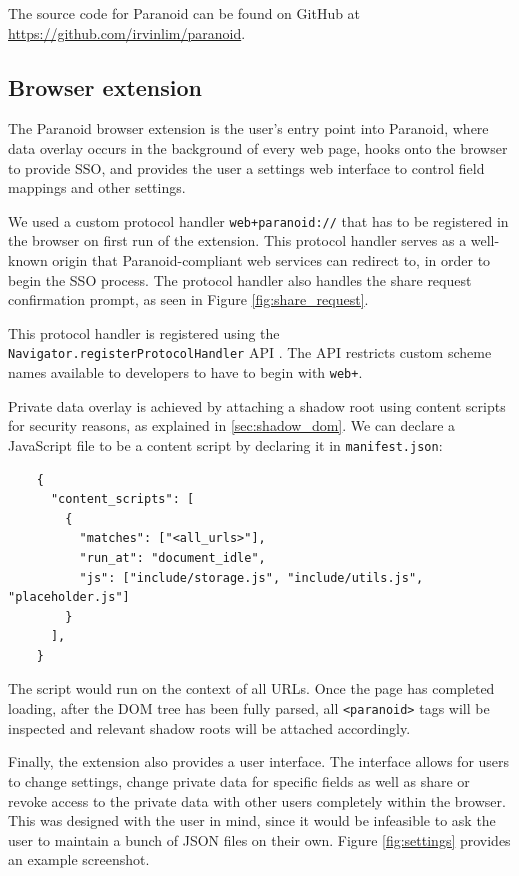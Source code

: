 \documentclass[letterpaper,twocolumn,10pt]{article}
\begin{document}
The source code for Paranoid can be found on GitHub at \url{https://github.com/irvinlim/paranoid}.

\subsection{Browser extension}

The Paranoid browser extension is the user's entry point into Paranoid, where data overlay occurs in the background of every web page, hooks onto the browser to provide SSO, and provides the user a settings web interface to control field mappings and other settings.

We used a custom protocol handler \texttt{web+paranoid://} that has to be registered in the browser on first run of the extension. This protocol handler serves as a well-known origin that Paranoid-compliant web services can redirect to, in order to begin the SSO process. The protocol handler also handles the share request confirmation prompt, as seen in Figure \ref{fig:share_request}.

This protocol handler is registered using the \texttt{Navigator.registerProtocolHandler} API \cite{RegisterProtocolHandler}. The API restricts custom scheme names available to developers to have to begin with \texttt{web+}.

Private data overlay is achieved by attaching a shadow root using content scripts for security reasons, as explained in \cref{sec:shadow_dom}. We can declare a JavaScript file to be a content script by declaring it in \texttt{manifest.json}:

\begin{center}
    \begin{lstlisting}
    {
      "content_scripts": [
        {
          "matches": ["<all_urls>"],
          "run_at": "document_idle",
          "js": ["include/storage.js", "include/utils.js", "placeholder.js"]
        }
      ],
    }
    \end{lstlisting}
\end{center}

The script would run on the context of all URLs. Once the page has completed loading, after the DOM tree has been fully parsed, all \texttt{<paranoid>} tags will be inspected and relevant shadow roots will be attached accordingly.

Finally, the extension also provides a user interface. The interface allows for users to change settings, change private data for specific fields as well as share or revoke access to the private data with other users completely within the browser. This was designed with the user in mind, since it would be infeasible to ask the user to maintain a bunch of JSON files on their own. Figure \ref{fig:settings} provides an example screenshot.
\end{document}
